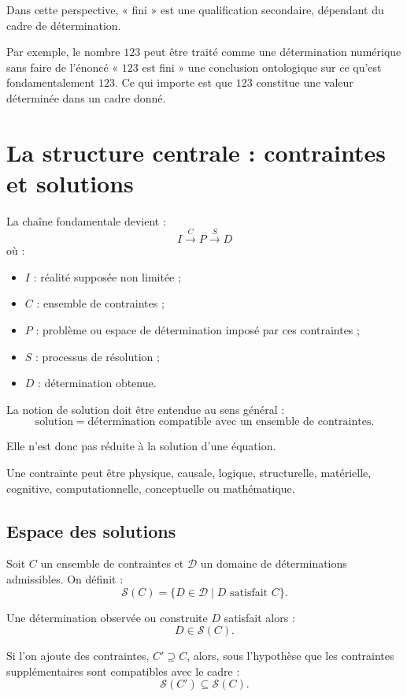 \documentclass[11pt,a4paper]{article}
\begin{document}
Dans cette perspective, « fini » est une qualification secondaire, dépendant
du cadre de détermination.

Par exemple, le nombre \(123\) peut être traité comme une détermination
numérique sans faire de l'énoncé « \(123\) est fini » une conclusion
ontologique sur ce qu'est fondamentalement \(123\). Ce qui importe est que
\(123\) constitue une valeur déterminée dans un cadre donné.

\section{La structure centrale : contraintes et solutions}

La chaîne fondamentale devient :
\[
\boxed{
I
\overset{C}{\longrightarrow}
P
\overset{S}{\longrightarrow}
D
}
\]
où :
\begin{itemize}
\item \(I\) : réalité supposée non limitée ;
\item \(C\) : ensemble de contraintes ;
\item \(P\) : problème ou espace de détermination imposé par ces contraintes ;
\item \(S\) : processus de résolution ;
\item \(D\) : détermination obtenue.
\end{itemize}

La notion de solution doit être entendue au sens général :
\[
\boxed{
\text{solution}=
\text{détermination compatible avec un ensemble de contraintes}.
}
\]

Elle n'est donc pas réduite à la solution d'une équation.

Une contrainte peut être physique, causale, logique, structurelle,
matérielle, cognitive, computationnelle, conceptuelle ou mathématique.

\subsection{Espace des solutions}

Soit \(C\) un ensemble de contraintes et \(\mathcal D\) un domaine de
déterminations admissibles. On définit :
\[
\mathcal S(C)=
\{D\in\mathcal D\mid D\text{ satisfait }C\}.
\]

Une détermination observée ou construite \(D\) satisfait alors :
\[
D\in\mathcal S(C).
\]

Si l'on ajoute des contraintes, \(C'\supseteq C\), alors, sous l'hypothèse
que les contraintes supplémentaires sont compatibles avec le cadre :
\[
\boxed{\mathcal S(C')\subseteq\mathcal S(C).}
\]
\end{document}
